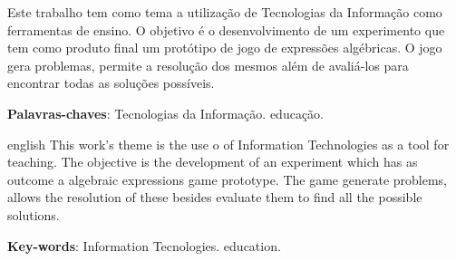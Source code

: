 
\setlength{\absparsep}{18pt} %
\begin{resumo}
 Este trabalho tem como tema a utilização de Tecnologias da Informação como ferramentas de ensino. O objetivo é o desenvolvimento de um  experimento que tem como produto final um protótipo de jogo de expressões algébricas. O jogo gera problemas, permite a resolução dos mesmos além de avaliá-los para encontrar todas as soluções possíveis.

 \textbf{Palavras-chaves}: Tecnologias da Informação. educação.
\end{resumo}

\begin{resumo}[Abstract]
 \begin{otherlanguage*}{english}
   This work's theme is the use o of Information Technologies as a tool for teaching. The objective is the development of an experiment which has as outcome a algebraic expressions game prototype. The game generate problems, allows the resolution of these besides evaluate them to find all the possible solutions.

   \vspace{\onelineskip}
 
   \noindent 
   \textbf{Key-words}: Information Tecnologies. education.
 \end{otherlanguage*}
\end{resumo}

